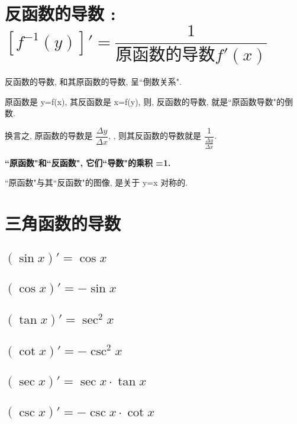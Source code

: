 \documentclass[UTF8]{ctexart}
\begin{document}
\section{反函数的导数 : $\boxed{[f^{-1}(y)]' = \dfrac{1} {\text{原函数的导数} f'(x)}}$}


反函数的导数, 和其原函数的导数, 呈``倒数关系". 

原函数是 y=f(x), 其反函数是 x=f(y), 则, 反函数的导数, 就是``原函数导数"的倒数. 


换言之, 原函数的导数是 $\dfrac{\varDelta y}{\varDelta x} $, , 则其反函数的导数就是  $\dfrac{1}{\frac{\varDelta y}{\varDelta x}}$.

\textbf{``原函数"和``反函数", 它们``导数"的乘积 =1.}

``原函数"与其``反函数"的图像, 是关于 y=x 对称的.




\section{三角函数的导数}

\subsection{$(\sin x)' = \cos x$}

\subsection{$(\cos x)' = -\sin x$}

\subsection{$(\tan x)' = \sec^2 x$}

\subsection{$(\cot x)' = -\csc^2 x$}

\subsection{$(\sec x)' = \sec x  \cdot \tan x$}

\subsection{ $(\csc x)' = - \csc x \cdot \cot x$}
\end{document}

